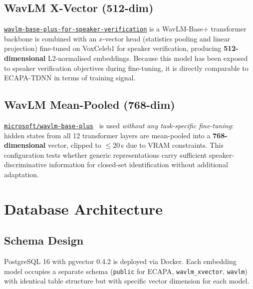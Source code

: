 \documentclass[12pt, a4paper]{article}
\newcommand{\code}[1]{\texttt{#1}}
\begin{document}
\subsection{WavLM X-Vector (512-dim)}

\href{https://huggingface.co/microsoft/wavlm-base-plus-sv#wavlm-base-plus-for-speaker-verification}%
{\code{wavlm-base-plus-for-speaker-verification}} is a WavLM-Base+ transformer backbone is combined with an $x$-vector head
(statistics pooling and linear projection) fine-tuned on VoxCeleb1 for speaker
verification, producing \textbf{512-dimensional} L2-normalised embeddings.
Because this model has been exposed to speaker verification objectives
during fine-tuning, it is directly comparable to ECAPA-TDNN in terms
of training signal.

\subsection{WavLM Mean-Pooled (768-dim)}

\href{https://huggingface.co/microsoft/wavlm-base-plus}%
{\code{microsoft/wavlm-base-plus}}~\cite{chen2022wavlm} is used
\emph{without any task-specific fine-tuning}: hidden states from all
12 transformer layers are mean-pooled into a \textbf{768-dimensional}
vector, clipped to $\leq$20\,s due to VRAM constraints.
This configuration tests whether generic representations
carry sufficient speaker-discriminative information for closed-set
identification without additional adaptation.

\section{Database Architecture}
\label{sec:database}

\subsection{Schema Design}

PostgreSQL 16 with pgvector 0.4.2 is deployed via Docker.
Each embedding model occupies a separate schema
(\code{public} for ECAPA, \code{wavlm\_xvector}, \code{wavlm})
with identical table structure but with specific vector dimension for each model.
\end{document}
